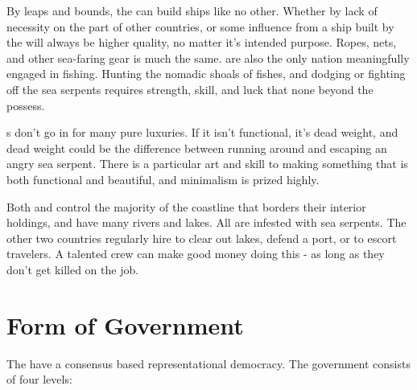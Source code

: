 \documentclass[blue]{GL2020}
\begin{document}
By leaps and bounds, the \pShippies{} can build ships like no other. Whether by lack of necessity on the part of other countries, or some influence from \cEbbFull{} a ship built by the \pShippies{} will always be higher quality, no matter it's intended purpose. Ropes, nets, and other sea-faring gear is much the same. \pShippies{} are also the only nation meaningfully engaged in fishing. Hunting the nomadic shoals of fishes, and dodging or fighting off the sea serpents requires strength, skill, and luck that none beyond the \pShippies{} possess.

\pShippies{}s don't go in for many pure luxuries. If it isn't functional, it's dead weight, and dead weight could be the difference between running around and escaping an angry sea serpent. There is a particular art and skill to making something that is both functional and beautiful, and minimalism is prized highly.

Both \pFarm{} and \pTech{} control the majority of the coastline that borders their interior holdings, and \pFarm{} have many rivers and lakes. All are infested with sea serpents. The other two countries regularly hire \pShippies{} to clear out lakes, defend a port, or to escort travelers. A talented crew can make good money doing this - as long as they don't get killed on the job.

\section*{Form of Government} The \pShippies{} have a consensus based representational democracy. The government consists of four levels:
\end{document}
